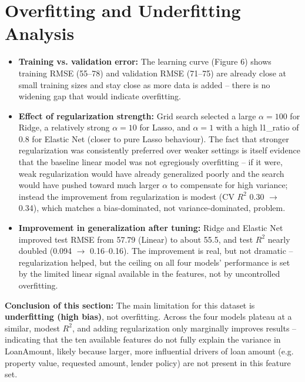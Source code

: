 \documentclass[12pt,a4paper]{article}
\begin{document}
\section{Overfitting and Underfitting Analysis}
\begin{itemize}
\item \textbf{Training vs. validation error:} The learning curve (Figure 6) shows training
RMSE (55--78) and validation RMSE (71--75) are already close at small training sizes and stay
close as more data is added -- there is no widening gap that would indicate overfitting.
\item \textbf{Effect of regularization strength:} Grid search selected a large $\alpha=100$
for Ridge, a relatively strong $\alpha=10$ for Lasso, and $\alpha=1$ with a high l1\_ratio of
0.8 for Elastic Net (closer to pure Lasso behaviour). The fact that stronger regularization was
consistently preferred over weaker settings is itself evidence that the baseline linear model
was not egregiously overfitting -- if it were, weak regularization would have already
generalized poorly and the search would have pushed toward much larger $\alpha$ to compensate
for high variance; instead the improvement from regularization is modest (CV $R^2$ 0.30
$\rightarrow$ 0.34), which matches a bias-dominated, not variance-dominated, problem.
\item \textbf{Improvement in generalization after tuning:} Ridge and Elastic Net improved test
RMSE from 57.79 (Linear) to about 55.5, and test $R^2$ nearly doubled (0.094 $\rightarrow$
0.16--0.16). The improvement is real, but not dramatic -- regularization helped, but the
ceiling on all four models' performance is set by the limited linear signal available in the
features, not by uncontrolled overfitting.
\end{itemize}
\textbf{Conclusion of this section:} The main limitation for this dataset is
\textbf{underfitting (high bias)}, not overfitting. Across the four models plateau at a similar,
modest $R^2$, and adding regularization only marginally improves results -- indicating that
the ten available features do not fully explain the variance in LoanAmount, likely because
larger, more influential drivers of loan amount (e.g. property value, requested amount,
lender policy) are not present in this feature set.
\end{document}

